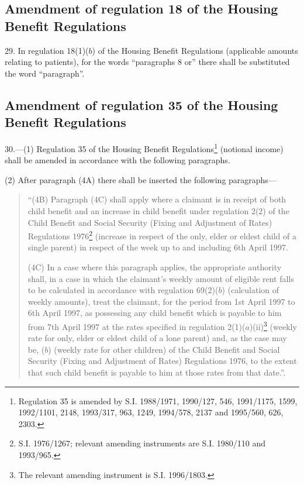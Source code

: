 \documentclass[a4paper]{article}
\begin{document}
\subsection[29. Amendment of regulation 18 of the Housing Benefit Regulations]{Amendment of regulation 18 of the Housing Benefit Regulations}

29.  In regulation 18(1)($b$) of the Housing Benefit Regulations (applicable amounts relating to patients), for the words “paragraphs 8 or” there shall be substituted the word “paragraph”.

\subsection[30. Amendment of regulation 35 of the Housing Benefit Regulations]{Amendment of regulation 35 of the Housing Benefit Regulations}

30.—(1) Regulation 35 of the Housing Benefit Regulations\footnote{\frenchspacing Regulation 35 is amended by S.I. 1988/1971, 1990/127, 546, 1991/1175, 1599, 1992/1101, 2148, 1993/317, 963, 1249, 1994/578, 2137 and 1995/560, 626, 2303.} (notional income) shall be amended in accordance with the following paragraphs.

(2) After paragraph (4A) there shall be inserted the following paragraphs—
\begin{quotation}
“(4B) Paragraph (4C) shall apply where a claimant is in receipt of both child benefit and an increase in child benefit under regulation 2(2) of the Child Benefit and Social Security (Fixing and Adjustment of Rates) Regulations 1976\footnote{\frenchspacing S.I. 1976/1267; relevant amending instruments are S.I. 1980/110 and 1993/965.} (increase in respect of the only, elder or eldest child of a single parent) in respect of the week up to and including 6th April 1997.

(4C) In a case where this paragraph applies, the appropriate authority shall, in a case in which the claimant’s weekly amount of eligible rent falls to be calculated in accordance with regulation 69(2)($b$) (calculation of weekly amounts), treat the claimant, for the period from 1st April 1997 to 6th April 1997, as possessing any child benefit which is payable to him from 7th April 1997 at the rates specified in regulation 2(1)($a$)(ii)\footnote{\frenchspacing The relevant amending instrument is S.I. 1996/1803.} (weekly rate for only, elder or eldest child of a lone parent) and, as the case may be, ($b$) (weekly rate for other children) of the Child Benefit and Social Security (Fixing and Adjustment of Rates) Regulations 1976, to the extent that such child benefit is payable to him at those rates from that date.”.
\end{quotation}
\end{document}
